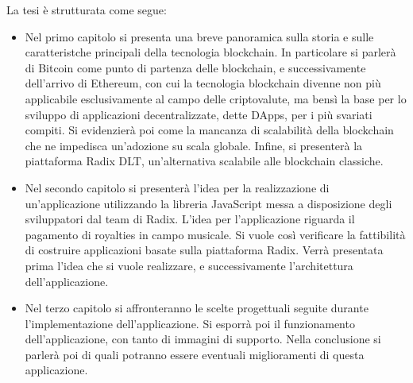 La tesi è strutturata come segue:
\begin{itemize}

    \item Nel primo capitolo si presenta una breve panoramica sulla storia e sulle caratteristche principali della tecnologia blockchain. In particolare si parlerà di Bitcoin come punto di partenza delle blockchain, e successivamente dell'arrivo di Ethereum, con cui la tecnologia blockchain divenne non più applicabile esclusivamente al campo delle criptovalute, ma bensì la base per lo sviluppo di applicazioni decentralizzate, dette DApps, per i più svariati compiti. Si evidenzierà poi come la mancanza di scalabilità della blockchain che ne impedisca un'adozione su scala globale. Infine, si presenterà la piattaforma Radix DLT, un'alternativa scalabile alle blockchain classiche.
    
    \item Nel secondo capitolo si presenterà l'idea per la realizzazione di un'applicazione utilizzando la libreria JavaScript messa a disposizione degli sviluppatori dal team di Radix. L'idea per l'applicazione riguarda il pagamento di royalties in campo musicale. Si vuole così verificare la fattibilità di costruire applicazioni basate sulla piattaforma Radix. Verrà presentata prima l'idea che si vuole realizzare, e successivamente l'architettura dell'applicazione.
    
    \item Nel terzo capitolo si affronteranno le scelte progettuali seguite durante l'implementazione dell'applicazione. Si esporrà poi il funzionamento dell'applicazione, con tanto di immagini di supporto. Nella conclusione si parlerà poi di quali potranno essere eventuali miglioramenti di questa applicazione.
    
\end{itemize}

\clearpage{\pagestyle{empty}\cleardoublepage}